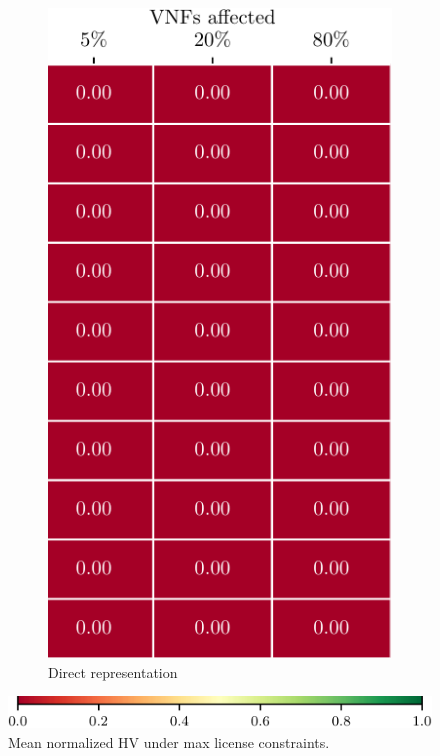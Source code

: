 \begin{figure}[t!]
\begin{subfigure}[b]{0.3732\linewidth}
        \includegraphics[width=\textwidth]{graphs/constraints/std_NSGAII_LIM-crop}
        \caption{Direct representation}
    \end{subfigure}
    \vspace{0.3em}

    \hspace{2em}
    \includegraphics[width=.8\linewidth]{graphs/constraints/key-crop}
    \caption{Mean normalized HV under max license constraints.}
    \label{fig:limited_licenses}
\end{figure}
